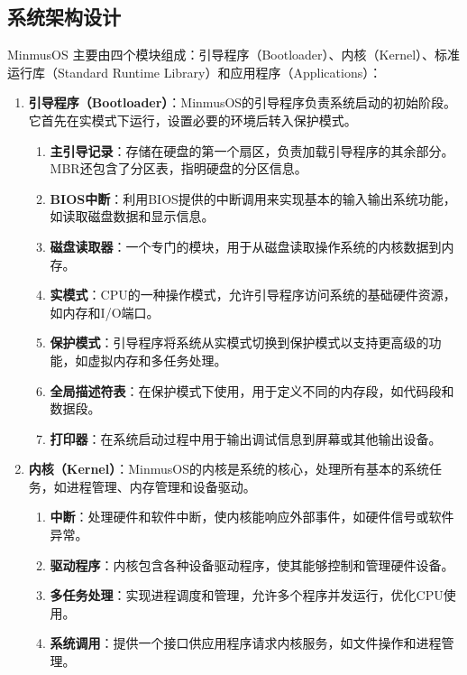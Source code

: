 \subsection{系统架构设计}

MinmusOS 主要由四个模块组成：引导程序（Bootloader）、内核（Kernel）、标准运行库（Standard Runtime Library）和应用程序（Applications）：

\begin{enumerate}
    \item \textbf{引导程序（Bootloader）}：MinmusOS的引导程序负责系统启动的初始阶段。它首先在实模式下运行，设置必要的环境后转入保护模式。
          \begin{enumerate}
              \item \textbf{主引导记录}：存储在硬盘的第一个扇区，负责加载引导程序的其余部分。MBR还包含了分区表，指明硬盘的分区信息。
              \item \textbf{BIOS中断}：利用BIOS提供的中断调用来实现基本的输入输出系统功能，如读取磁盘数据和显示信息。
              \item \textbf{磁盘读取器}：一个专门的模块，用于从磁盘读取操作系统的内核数据到内存。
              \item \textbf{实模式}：CPU的一种操作模式，允许引导程序访问系统的基础硬件资源，如内存和I/O端口。
              \item \textbf{保护模式}：引导程序将系统从实模式切换到保护模式以支持更高级的功能，如虚拟内存和多任务处理。
              \item \textbf{全局描述符表}：在保护模式下使用，用于定义不同的内存段，如代码段和数据段。
              \item \textbf{打印器}：在系统启动过程中用于输出调试信息到屏幕或其他输出设备。
          \end{enumerate}
    \item \textbf{内核（Kernel）}：MinmusOS的内核是系统的核心，处理所有基本的系统任务，如进程管理、内存管理和设备驱动。
          \begin{enumerate}
              \item \textbf{中断}：处理硬件和软件中断，使内核能响应外部事件，如硬件信号或软件异常。
              \item \textbf{驱动程序}：内核包含各种设备驱动程序，使其能够控制和管理硬件设备。
              \item \textbf{多任务处理}：实现进程调度和管理，允许多个程序并发运行，优化CPU使用。
              \item \textbf{系统调用}：提供一个接口供应用程序请求内核服务，如文件操作和进程管理。

\end{enumerate}
\end{enumerate}
